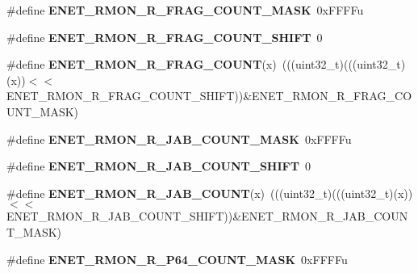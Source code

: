\begin{DoxyCompactItemize}
\item 
\#define {\bfseries E\+N\+E\+T\+\_\+\+R\+M\+O\+N\+\_\+\+R\+\_\+\+F\+R\+A\+G\+\_\+\+C\+O\+U\+N\+T\+\_\+\+M\+A\+SK}~0x\+F\+F\+F\+Fu\hypertarget{group__ENET__Register__Masks_ga5f5c83f39cebf731ec8d463d94ce3f03}{}\label{group__ENET__Register__Masks_ga5f5c83f39cebf731ec8d463d94ce3f03}

\item 
\#define {\bfseries E\+N\+E\+T\+\_\+\+R\+M\+O\+N\+\_\+\+R\+\_\+\+F\+R\+A\+G\+\_\+\+C\+O\+U\+N\+T\+\_\+\+S\+H\+I\+FT}~0\hypertarget{group__ENET__Register__Masks_ga5ef532dea7d45ccc23afff7d7c17c16f}{}\label{group__ENET__Register__Masks_ga5ef532dea7d45ccc23afff7d7c17c16f}

\item 
\#define {\bfseries E\+N\+E\+T\+\_\+\+R\+M\+O\+N\+\_\+\+R\+\_\+\+F\+R\+A\+G\+\_\+\+C\+O\+U\+NT}(x)~(((uint32\+\_\+t)(((uint32\+\_\+t)(x))$<$$<$E\+N\+E\+T\+\_\+\+R\+M\+O\+N\+\_\+\+R\+\_\+\+F\+R\+A\+G\+\_\+\+C\+O\+U\+N\+T\+\_\+\+S\+H\+I\+FT))\&E\+N\+E\+T\+\_\+\+R\+M\+O\+N\+\_\+\+R\+\_\+\+F\+R\+A\+G\+\_\+\+C\+O\+U\+N\+T\+\_\+\+M\+A\+SK)\hypertarget{group__ENET__Register__Masks_ga83e66016eed8916198ebd6604af4e1aa}{}\label{group__ENET__Register__Masks_ga83e66016eed8916198ebd6604af4e1aa}

\item 
\#define {\bfseries E\+N\+E\+T\+\_\+\+R\+M\+O\+N\+\_\+\+R\+\_\+\+J\+A\+B\+\_\+\+C\+O\+U\+N\+T\+\_\+\+M\+A\+SK}~0x\+F\+F\+F\+Fu\hypertarget{group__ENET__Register__Masks_ga838c0d34688a6347e786a3a66de2fc66}{}\label{group__ENET__Register__Masks_ga838c0d34688a6347e786a3a66de2fc66}

\item 
\#define {\bfseries E\+N\+E\+T\+\_\+\+R\+M\+O\+N\+\_\+\+R\+\_\+\+J\+A\+B\+\_\+\+C\+O\+U\+N\+T\+\_\+\+S\+H\+I\+FT}~0\hypertarget{group__ENET__Register__Masks_gaec7a433149507aefe611734ae19e7878}{}\label{group__ENET__Register__Masks_gaec7a433149507aefe611734ae19e7878}

\item 
\#define {\bfseries E\+N\+E\+T\+\_\+\+R\+M\+O\+N\+\_\+\+R\+\_\+\+J\+A\+B\+\_\+\+C\+O\+U\+NT}(x)~(((uint32\+\_\+t)(((uint32\+\_\+t)(x))$<$$<$E\+N\+E\+T\+\_\+\+R\+M\+O\+N\+\_\+\+R\+\_\+\+J\+A\+B\+\_\+\+C\+O\+U\+N\+T\+\_\+\+S\+H\+I\+FT))\&E\+N\+E\+T\+\_\+\+R\+M\+O\+N\+\_\+\+R\+\_\+\+J\+A\+B\+\_\+\+C\+O\+U\+N\+T\+\_\+\+M\+A\+SK)\hypertarget{group__ENET__Register__Masks_gaf4a53632e9204c3fa6b812bb2c924976}{}\label{group__ENET__Register__Masks_gaf4a53632e9204c3fa6b812bb2c924976}

\item 
\#define {\bfseries E\+N\+E\+T\+\_\+\+R\+M\+O\+N\+\_\+\+R\+\_\+\+P64\+\_\+\+C\+O\+U\+N\+T\+\_\+\+M\+A\+SK}~0x\+F\+F\+F\+Fu\hypertarget{group__ENET__Register__Masks_ga68d9c25cccce4ef0703577bf06b5bb58}{}\label{group__ENET__Register__Masks_ga68d9c25cccce4ef0703577bf06b5bb58}


\end{DoxyCompactItemize}
